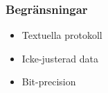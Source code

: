 \documentclass[xetex]{beamer}
\begin{document}
    \begin{frame}
        \frametitle{Begränsningar}
        \begin{itemize}
            \item Textuella protokoll
            \item Icke-justerad data
            \item Bit-precision
        \end{itemize}
    \end{frame}
\end{document}
